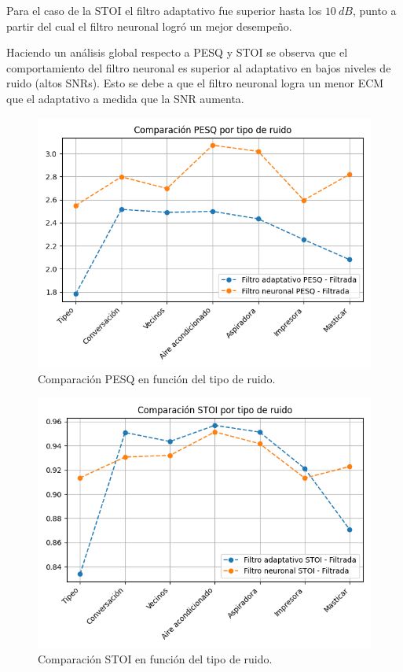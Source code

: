 Para el caso de la STOI el filtro adaptativo fue superior hasta los $\SI{10}{dB}$, punto a partir del cual el filtro neuronal logró un mejor desempeño.  

Haciendo un análisis global respecto a PESQ y STOI se observa que el comportamiento del filtro neuronal es superior al adaptativo en bajos niveles de ruido (altos SNRs). Esto se debe a que el filtro neuronal logra un menor ECM que el adaptativo a medida que la SNR aumenta.

\begin{figure}
	\centering
	\centerline{\includegraphics[scale=0.75]{images/ch8/comparison_pesq_by_noise_type.png}}
	\caption{Comparación PESQ en función del tipo de ruido.}
	\label{fig:ch8_pesq_comparison_by_noise_type}
\end{figure}

\begin{figure}
	\centering
	\centerline{\includegraphics[scale=0.75]{images/ch8/comparison_stoi_by_noise_type.png}}
	\caption{Comparación STOI en función del tipo de ruido.}
	\label{fig:ch8_stoi_comparison_by_noise_type}
\end{figure}

